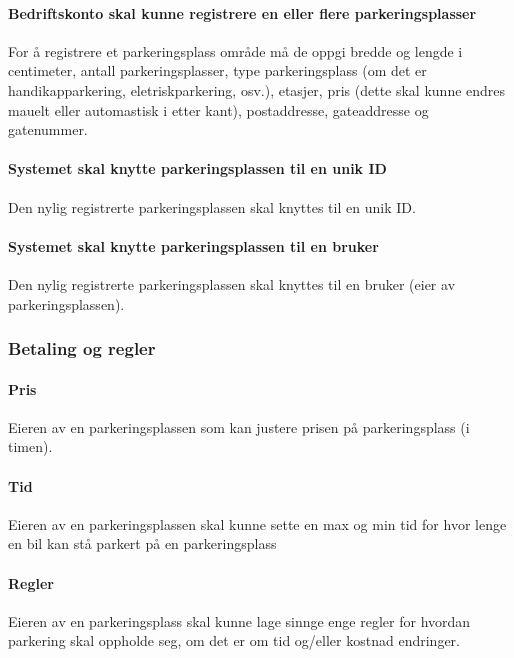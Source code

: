 \documentclass[12pt]{article}
\begin{document}
            \paragraph{Bedriftskonto skal kunne registrere en eller flere parkeringsplasser}
            For å registrere et parkeringsplass område må de oppgi bredde og lengde i centimeter, antall parkeringsplasser, type parkeringsplass (om det er handikapparkering, eletriskparkering, osv.), etasjer, pris (dette skal kunne endres mauelt eller automastisk i etter kant), postaddresse, gateaddresse og gatenummer.

            \paragraph{Systemet skal knytte parkeringsplassen til en unik ID}
            Den nylig registrerte parkeringsplassen skal knyttes til en unik ID.

            \paragraph{Systemet skal knytte parkeringsplassen til en bruker}
            Den nylig registrerte parkeringsplassen skal knyttes til en bruker (eier av parkeringsplassen).

        \subsubsection{Betaling og regler}

            \paragraph{Pris}
            Eieren av en parkeringsplassen som kan justere prisen på parkeringsplass (i timen).

            \paragraph{Tid}
            Eieren av en parkeringsplassen skal kunne sette en max og min tid for hvor lenge en bil kan stå parkert på en parkeringsplass

            \paragraph{Regler}
            Eieren av en parkeringsplass skal kunne lage sinnge enge regler for hvordan parkering skal oppholde seg, om det er om tid og/eller kostnad endringer.
        
\end{document}
